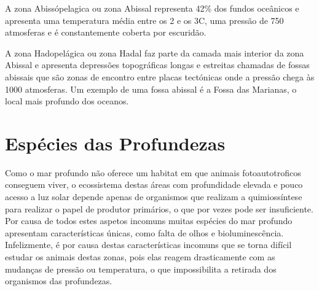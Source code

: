 \documentclass{report}
\begin{document}
A zona Abissópelagica ou zona Abissal representa 42\% dos fundos oceânicos e apresenta uma temperatura média entre os 2 e os 3\textordmasculine C, uma pressão de 750 atmosferas e é constantemente coberta por escuridão.

A zona Hadopelágica ou zona Hadal faz parte da camada mais interior da zona Abissal e apresenta depressões topográficas longas e estreitas chamadas de fossas abissais que são zonas de encontro entre placas tectónicas onde a pressão chega às 1000 atmosferas. Um exemplo de uma fossa abissal é a Fossa das Marianas, o local mais profundo dos oceanos.
\\
\section{Espécies das Profundezas}
Como o mar profundo não oferece um habitat em que animais fotoautotroficos conseguem viver, o ecossistema destas áreas com profundidade elevada e pouco acesso a luz solar depende apenas de organismos que realizam a quimiossíntese para realizar o papel de produtor primários, o que por vezes pode ser insuficiente. Por causa de todos estes aspetos incomuns muitas espécies do mar profundo apresentam características únicas, como falta de olhos e bioluminescência. Infelizmente, é por causa destas características incomuns que se torna difícil estudar os animais destas zonas, pois elas reagem drasticamente com as mudanças de pressão ou temperatura, o que impossibilita a retirada dos organismos das profundezas.
\end{document}
